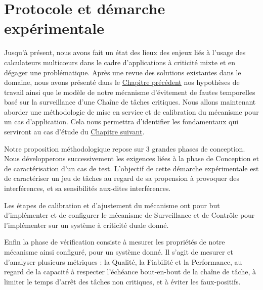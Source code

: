 \documentclass[french, a4paper, 11pt, twoside, pdftex]{StyleThese}
\begin{document}
\setcounter{chapter}{3} %
\dominitoc
\faketableofcontents
\fi

\chapter{Protocole et démarche expérimentale} \label{chap:4_ProtocolExpe}
\minitoc

Jusqu'à présent, nous avons fait un état des lieux des enjeux liés à l'usage des calculateurs multicœurs dans le cadre d'applications à criticité mixte et en dégager une problématique. Après une revue des solutions existantes dans le domaine, nous avons présenté dans le \hyperref[chap:3_PrincipeArchi]{Chapitre précédent} nos hypothèses de travail ainsi que le modèle de notre mécanisme d'évitement de fautes temporelles basé sur la surveillance d'une Chaîne de tâches critiques. Nous allons maintenant aborder une méthodologie de mise en service et de calibration du mécanisme pour un cas d'application. Cela nous permettra d'identifier les fondamentaux qui serviront au cas d'étude du \hyperref[chap:5_ImplementationCase]{Chapitre suivant}.

Notre proposition méthodologique repose sur 3 grandes phases de conception. Nous développerons successivement les exigences liées à la phase de Conception et de caractérisation d'un cas de test. L'objectif de cette démarche expérimentale est de caractériser un jeu de tâches au regard de sa propension à provoquer des interférences, et sa sensibilités aux-dites interférences. 

Les étapes de calibration et d'ajustement du mécanisme ont pour but d'implémenter et de configurer le mécanisme de Surveillance et de Contrôle pour l'implémenter sur un système à criticité duale donné.

Enfin la phase de vérification consiste à mesurer les propriétés de notre mécanisme ainsi configuré, pour un système donné. Il s'agit de mesurer et d'analyser plusieurs métriques : la Qualité, la Fiabilité et la Performance, au regard de la capacité à respecter l'échéance bout-en-bout de la chaîne de tâche, à limiter le temps d'arrêt des tâches non critiques, et à éviter les faux-positifs.



\pagebreak
\end{document}
